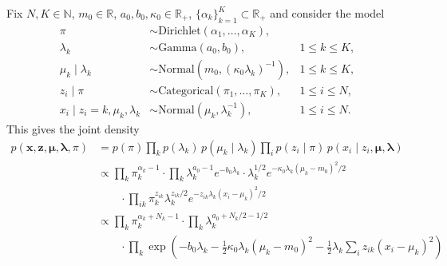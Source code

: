\documentclass[12pt]{article}
\newcommand{\N}{\mathbb{N}}
\newcommand{\R}{\mathbb{R}}
\begin{document}
Fix $N, K \in \N$, $m_0 \in \R$, $a_0, b_0, \kappa_0 \in \R_+$,
$\{\alpha_k\}_{k = 1}^K \subset \R_+$ and consider the model
\begin{align*}
    \pi &\sim \text{Dirichlet}(\alpha_1, \dots, \alpha_K), \\
    \lambda_k &\sim \text{Gamma}(a_0, b_0), & 1 \leq k \leq K, \\
    \mu_k \mid \lambda_k &\sim \text{Normal}(m_0, (\kappa_0\lambda_k)^{-1}), & 1 \leq k \leq K, \\
    z_i \mid \pi &\sim \text{Categorical}(\pi_1, \dots, \pi_K), & 1 \leq i \leq N, \\
    x_i \mid z_i = k, \mu_k, \lambda_k &\sim \text{Normal}(\mu_k, \lambda_k^{-1}), & 1 \leq i \leq N.
\end{align*}
This gives the joint density \begin{align*}
    p(\bm{x}, \bm{z}, \bm{\mu}, \bm{\lambda}, \pi)
        &= p(\pi) \prod_k p(\lambda_k)\, p(\mu_k\mid \lambda_k)\prod_i p(z_i \mid \pi)\, p(x_i \mid z_i, \bm{\mu}, \bm{\lambda}) \\
        &\propto \prod_k \pi_k^{\alpha_k - 1} \cdot \prod_k \lambda_k^{a_0 - 1} e^{-b_0\lambda_k} \cdot \lambda_k^{1 /2} e^{-\kappa_0\lambda_k(\mu_k - m_0)^2 /2} \\
            &\qquad \cdot \prod_{ik} \pi_k^{z_{ik}} \lambda_k^{z_{ik} /2} e^{-z_{ik}\lambda_k (x_i - \mu_k)^2 / 2} \\
        &\propto \prod_k \pi_k^{\alpha_k + N_k - 1} \cdot \prod_k \lambda_k^{a_0 + N_k / 2 - 1 /2} \\
            &\qquad \cdot \prod_k \exp\left(-b_0\lambda_k -\frac{1}{2}\kappa_0\lambda_k(\mu_k - m_0)^2 -\frac{1}{2}\lambda_k\sum_i z_{ik}(x_i - \mu_k)^2\right)
            \tag{$\star\star$} \label{Q2_joint}
\end{align*}
\end{document}
